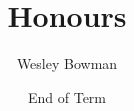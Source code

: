 \documentclass[12pt]{report}
\theoremstyle{definition}
\begin{document}
\title{Honours}
\date{End of Term}
\author{Wesley Bowman}
\maketitle
\pagebreak

\tableofcontents

\pagebreak
%
%
\end{document}
